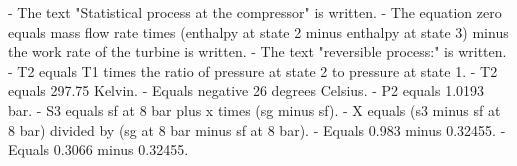 - The text "Statistical process at the compressor" is written.
- The equation zero equals mass flow rate times (enthalpy at state 2 minus enthalpy at state 3) minus the work rate of the turbine is written.
- The text "reversible process:" is written.
- T2 equals T1 times the ratio of pressure at state 2 to pressure at state 1.
- T2 equals 297.75 Kelvin.
- Equals negative 26 degrees Celsius.
- P2 equals 1.0193 bar.
- S3 equals sf at 8 bar plus x times (sg minus sf).
- X equals (s3 minus sf at 8 bar) divided by (sg at 8 bar minus sf at 8 bar).
- Equals 0.983 minus 0.32455.
- Equals 0.3066 minus 0.32455.